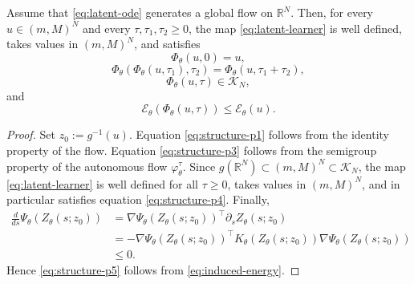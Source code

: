\documentclass[hidelinks,review,nohypdvips,onefignum,onetabnum]{siamart220329}
\newcommand{\R}{\mathbb{R}}
\newcommand{\cK}{\mathcal{K}}
\newcommand{\cE}{\mathcal{E}}
\newcommand{\PhiT}{\Phi_{\theta}}
\begin{document}
\begin{proposition}\label{prop:structure}
Assume that \eqref{eq:latent-ode} generates a global flow on \(\R^N\). Then, for every \(u\in (m,M)^N\) and every \(\tau,\tau_1,\tau_2\ge 0\), the map \eqref{eq:latent-learner} is well defined, takes values in \((m,M)^N\), and satisfies
\begin{equation}\label{eq:structure-p1}
\PhiT(u,0)=u,
\end{equation}
\begin{equation}\label{eq:structure-p3}
\PhiT(\PhiT(u,\tau_1),\tau_2)=\PhiT(u,\tau_1+\tau_2),
\end{equation}
\begin{equation}\label{eq:structure-p4}
\PhiT(u,\tau)\in \cK_N,
\end{equation}
and
\begin{equation}\label{eq:structure-p5}
\cE_{\theta}(\PhiT(u,\tau))\le \cE_{\theta}(u).
\end{equation}
\end{proposition}

\begin{proof}
Set \(z_0:=g^{-1}(u)\). Equation \eqref{eq:structure-p1} follows from the identity property of the flow. Equation \eqref{eq:structure-p3} follows from the semigroup property of the autonomous flow \(\varphi_{\theta}^{\tau}\). Since \(g(\R^N)\subset (m,M)^N\subset \cK_N\), the map \eqref{eq:latent-learner} is well defined for all \(\tau\ge 0\), takes values in \((m,M)^N\), and in particular satisfies equation \eqref{eq:structure-p4}. Finally,
\begin{align*}
\frac{d}{ds}\Psi_{\theta}(Z_{\theta}(s;z_0))
&=\nabla \Psi_{\theta}(Z_{\theta}(s;z_0))^\top \partial_s Z_{\theta}(s;z_0) \\
&=-\nabla \Psi_{\theta}(Z_{\theta}(s;z_0))^\top K_{\theta}(Z_{\theta}(s;z_0))\nabla \Psi_{\theta}(Z_{\theta}(s;z_0)) \\
&\le 0.
\end{align*}
Hence \eqref{eq:structure-p5} follows from \eqref{eq:induced-energy}.
\end{proof}
\end{document}
